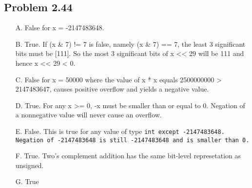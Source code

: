 \documentclass[a4paper]{article}
\begin{document}
\subsection*{Problem 2.44}
\begin{enumerate}
    \item [A.] False for x = -2147483648.
    \item [B.] True. If (x \& 7) != 7 is false, namely (x 
    \& 7) == 7, the least 3 significant bits must be [111]. So the most 3 significant bits of x << 29 will be 111 and hence x << 29 < 0.
    \item [C.] False for x = 50000 where the value of x * x equals 2500000000 > 2147483647, causes positive overflow and yields a negative value.
    \item [D.] True. For any x >= 0, -x must be smaller than or equal to 0. Negation of a nonnegative value will never cause an overflow.
    \item [E.] False. This is true for any value of type \tt{int} \rm{except} -2147483648. Negation of -2147483648 is still -2147483648 and is smaller than 0.
    \item [F.] True. Two's complement addition has the same bit-level represetation as unsigned.
    \item [G.] True
\end{enumerate}
\end{document}

